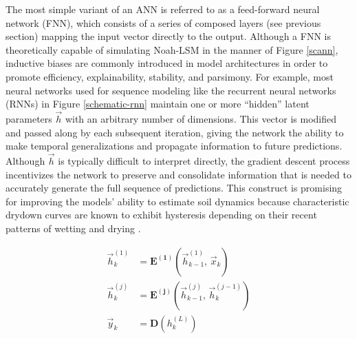 The most simple variant of an ANN is referred to as a feed-forward neural network (FNN), which consists of a series of composed layers (see previous section) mapping the input vector directly to the output. Although a FNN is theoretically capable of simulating Noah-LSM in the manner of Figure \ref{scann}, inductive biases are commonly introduced in model architectures in order to promote efficiency, explainability, stability, and parsimony. For example, most neural networks used for sequence modeling like the recurrent neural networks (RNNs) in Figure \ref{schematic-rnn} maintain one or more ``hidden'' latent parameters $\vec{h}$ with an arbitrary number of dimensions. This vector is modified and passed along by each subsequent iteration, giving the network the ability to make temporal generalizations and propagate information to future predictions. Although $\vec{h}$ is typically difficult to interpret directly, the gradient descent process incentivizes the network to preserve and consolidate information that is needed to accurately generate the full sequence of predictions. This construct is promising for improving the models' ability to estimate soil dynamics because characteristic drydown curves are known to exhibit hysteresis depending on their recent patterns of wetting and drying \parencite{haines_studies_1930}. %

\begin{equation}\label{eq_rnn}
    \begin{split}
        \vec{h}_k^{(1)} &= \mathbf{E^{(1)}}\left(\vec{h}_{k-1}^{(1)},\, \vec{x}_k\right) \\
        \vec{h}_k^{(j)} &= \mathbf{E^{(j)}}\left(\vec{h}_{k-1}^{(j)},\, \vec{h}_k^{(j-1)}\right) \\
        \vec{y}_k &= \mathbf{D}\left(h_k^{(L)}\right)
    \end{split}
\end{equation}


